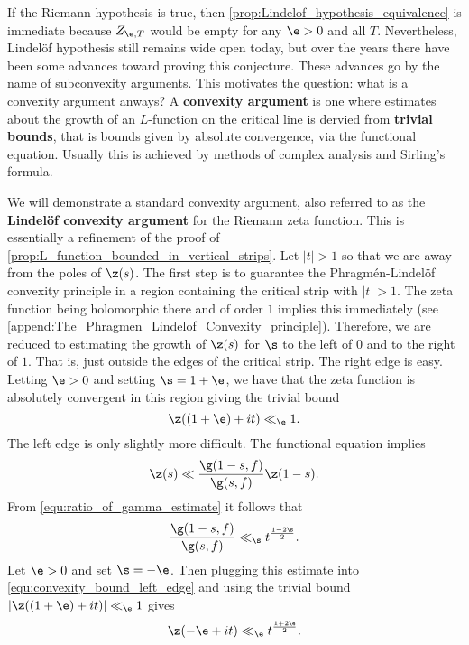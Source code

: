     If the Riemann hypothesis is true, then \cref{prop:Lindelof_hypothesis_equivalence} is immediate because $Z_{\e,T}$ would be empty for any $\e > 0$ and all $T$. Nevertheless, Lindel\"of hypothesis still remains wide open today, but over the years there have been some advances toward proving this conjecture. These advances go by the name of subconvexity arguments. This motivates the question: what is a convexity argument anways? A \textbf{convexity argument} is one where estimates about the growth of an $L$-function on the critical line is dervied from \textbf{trivial bounds}, that is bounds given by absolute convergence, via the functional equation. Usually this is achieved by methods of complex analysis and Sirling's formula.

    We will demonstrate a standard convexity argument, also referred to as the \textbf{Lindel\"of convexity argument} for the Riemann zeta function. This is essentially a refinement of the proof of \cref{prop:L_function_bounded_in_vertical_strips}. Let $|t| > 1$ so that we are away from the poles of $\z(s)$. The first step is to guarantee the Phragm\'en-Lindel\"of convexity principle in a region containing the critical strip with $|t| > 1$. The zeta function being holomorphic there and of order $1$ implies this immediately (see \cref{append:The_Phragmen_Lindelof_Convexity_principle}). Therefore, we are reduced to estimating the growth of $\z(s)$ for $\s$ to the left of $0$ and to the right of $1$. That is, just outside the edges of the critical strip. The right edge is easy. Letting $\e > 0$ and setting $\s = 1+\e$, we have that the zeta function is absolutely convergent in this region giving the trivial bound
    \begin{equation}\label{equ:convexity_bound_1}
      \z((1+\e)+it) \ll_{\e} 1.
    \end{equation}
    The left edge is only slightly more difficult. The functional equation implies
    \begin{equation}\label{equ:convexity_bound_left_edge}
      \z(s) \ll \frac{\g(1-s,f)}{\g(s,f)}\z(1-s).
    \end{equation}
    From \cref{equ:ratio_of_gamma_estimate} it follows that
    \[
      \frac{\g(1-s,f)}{\g(s,f)} \ll_{\s} t^{\frac{1-2\s}{2}}.
    \]
    Let $\e > 0$ and set $\s = -\e$. Then plugging this estimate into \cref{equ:convexity_bound_left_edge} and using the trivial bound $|\z((1+\e)+it)| \ll_{\e} 1$ gives
    \begin{equation}\label{equ:convexity_bound_2}
      \z(-\e+it) \ll_{\e} t^{\frac{1+2\e}{2}}.
    \end{equation}
